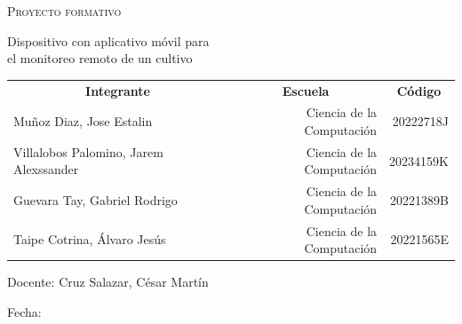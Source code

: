 \documentclass[../main]{subfiles}
\begin{document}
\begin{titlepage}
\begin{center}
		\vspace{5mm}

		{\large
			\textsc{Proyecto formativo}

			Dispositivo con aplicativo móvil para\\ el monitoreo remoto de un cultivo
		}

		\vspace{5mm}

		\begin{table}[H]
			\centering
			\begin{tabular}{lrr}
				\multicolumn{1}{c}{\textbf{ Integrante }} &
				\multicolumn{1}{c}{\textbf{ Escuela }}    &
				\multicolumn{1}{c}{\textbf{ Código }}                                             \\
				Muñoz Diaz, Jose Estalin                  & Ciencia de la Computación & 20222718J \\
				Villalobos Palomino, Jarem Alexssander    & Ciencia de la Computación & 20234159K \\
				Guevara Tay, Gabriel Rodrigo              & Ciencia de la Computación & 20221389B \\
				Taipe Cotrina, Álvaro Jesús               & Ciencia de la Computación & 20221565E
			\end{tabular}
		\end{table}

		Docente: Cruz Salazar, César Martín

		Fecha: 
	\end{center}
	\vspace*{\fill}
\end{titlepage}
\end{document}

